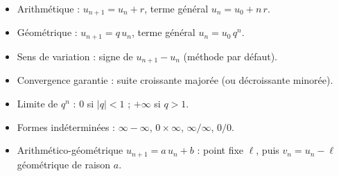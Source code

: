 \documentclass[11pt,a4paper]{article}
\begin{document}
\vspace{4mm}
\begin{tcolorbox}[
  enhanced, boxrule=0pt, arc=2mm,
  interior style={left color=qtealdark, right color=qteal},
  left=6mm, right=6mm, top=4mm, bottom=4mm,
  fontupper=\color{white}\sffamily,
  title={\sffamily\bfseries\color{white}\ding{72}~~À retenir},
  colbacktitle=qtealdark, coltitle=white, boxrule=0pt
]
\begin{itemize}[leftmargin=6mm, label={\color{qamber}}, itemsep=1mm]
  \item Arithmétique : $u_{n+1} = u_n + r$, terme général $u_n = u_0 + n\,r$.
  \item Géométrique : $u_{n+1} = q\,u_n$, terme général $u_n = u_0\,q^n$.
  \item Sens de variation : signe de $u_{n+1} - u_n$ (méthode par défaut).
  \item Convergence garantie : suite croissante majorée (ou décroissante minorée).
  \item Limite de $q^n$ : $0$ si $|q| < 1$ ; $+\infty$ si $q > 1$.
  \item Formes indéterminées : $\infty - \infty$, $0 \times \infty$, $\infty/\infty$, $0/0$.
  \item Arithmético-géométrique $u_{n+1} = a\,u_n + b$ : point fixe $\ell$, puis $v_n = u_n - \ell$ géométrique de raison $a$.
\end{itemize}
\end{tcolorbox}
\end{document}
